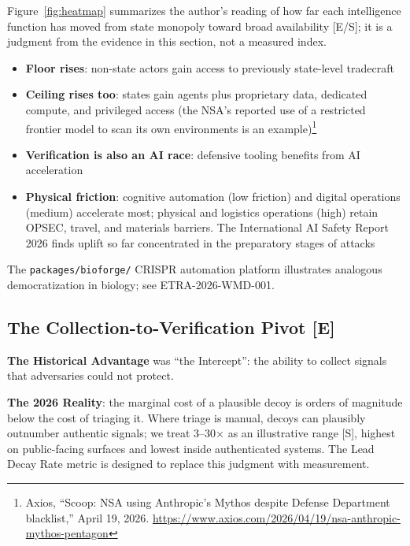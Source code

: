 \documentclass[11pt,letterpaper]{article}
\makeatletter
\newcommand{\etraneed}[1]{\par\if@nobreak\else\penalty\z@\ifdim\pagegoal<\maxdimen\ifdim\dimexpr\pagegoal-\pagetotal\relax<\dimexpr#1\relax\newpage\fi\fi\fi}
\makeatother
\begin{document}
Figure~\ref{fig:heatmap} summarizes the author's reading of how far each intelligence function has moved from state monopoly toward broad availability [E/S]; it is a judgment from the evidence in this section, not a measured index.

\etraneed{14\baselineskip}
\begin{infobox}
\begin{itemize}[nosep]
  \item \textbf{Floor rises}: non-state actors gain access to previously state-level tradecraft
  \item \textbf{Ceiling rises too}: states gain agents plus proprietary data, dedicated compute, and privileged access (the NSA's reported use of a restricted frontier model to scan its own environments is an example)\footnote{Axios, ``Scoop: NSA using Anthropic's Mythos despite Defense Department blacklist,'' April 19, 2026. \url{https://www.axios.com/2026/04/19/nsa-anthropic-mythos-pentagon}}
  \item \textbf{Verification is also an AI race}: defensive tooling benefits from AI acceleration
  \item \textbf{Physical friction}: cognitive automation (low friction) and digital operations (medium) accelerate most; physical and logistics operations (high) retain OPSEC, travel, and materials barriers. The International AI Safety Report 2026 finds uplift so far concentrated in the preparatory stages of attacks
\end{itemize}
The \texttt{packages/bioforge/} CRISPR automation platform illustrates analogous democratization in biology; see ETRA-2026-WMD-001.
\end{infobox}

\subsection{The Collection-to-Verification Pivot [E]}

\textbf{The Historical Advantage} was ``the Intercept'': the ability to collect signals that adversaries could not protect.

\textbf{The 2026 Reality}: the marginal cost of a plausible decoy is orders of magnitude below the cost of triaging it. Where triage is manual, decoys can plausibly outnumber authentic signals; we treat 3--30$\times$ as an illustrative range [S], highest on public-facing surfaces and lowest inside authenticated systems. The Lead Decay Rate metric is designed to replace this judgment with measurement.
\end{document}
